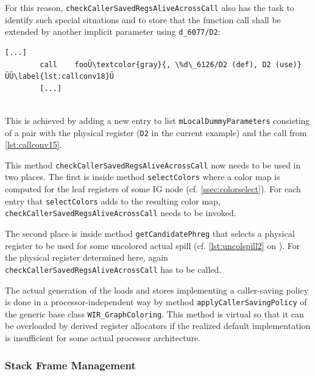 For this reason, \texttt{checkCallerSavedRegsAliveAcrossCall} also has the task to identify such special situations and to store that the function call shall be extended by another implicit parameter using \texttt{d\_6077/D2}: \\
\begin{lstlisting}[style=code,float=!h,aboveskip=-0.8 \baselineskip,belowskip=-0.8 \baselineskip]
        [...]
        call    fooÜ\textcolor{gray}{, \%d\_6126/D2 (def), D2 (use)}ÜÜ\label{lst:callconv18}Ü
        [...]
\end{lstlisting}
\\
This is achieved by adding a new entry to list \texttt{mLocalDummyParameters} consisting of a pair with the physical register (\texttt{D2} in the current example) and the call from \cref{lst:callconv15}.

This method \texttt{checkCallerSavedRegsAliveAcrossCall} now needs to be used in two places.
The first is inside method \texttt{selectColors} where a color map is computed for the leaf registers of some \gls{IG} node (cf. \cref{ssec:colorselect}).
For each entry that \texttt{selectColors} adds to the resulting color map, \texttt{checkCallerSavedRegsAliveAcross\-Call} needs to be invoked.

The second place is inside method \texttt{getCandidatePhreg} that selects a physical register to be used for some uncolored actual spill (cf. \cref{lst:uncolspill2} on ).
For the physical register determined here, again \texttt{checkCaller\-SavedRegsAliveAcrossCall} has to be called.

The actual generation of the loads and stores implementing a caller-saving policy is done in a processor-inde\-pen\-dent way by method \texttt{applyCallerSavingPolicy} of the generic base class \texttt{WIR\_GraphColoring}.
This method is virtual so that it can be overloaded by derived register allocators if the realized default implementation is insufficient for some actual processor architecture.


\subsubsection{Stack Frame Management}
\label{sssec:stackmgmt}

